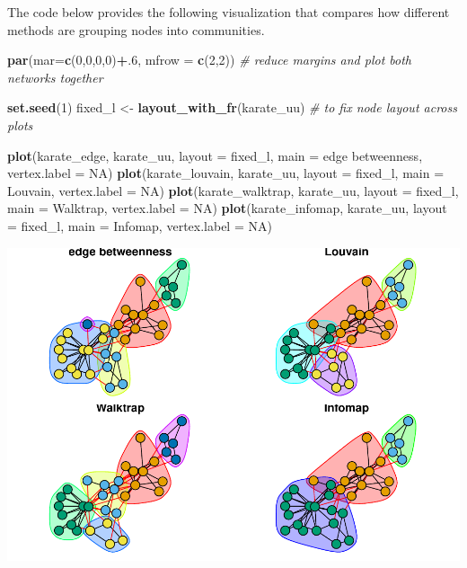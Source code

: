 \documentclass[
]{book}
\newenvironment{Shaded}{\begin{snugshade}}{\end{snugshade}}
\newcommand{\AttributeTok}[1]{\textcolor[rgb]{0.13,0.29,0.53}{#1}}
\newcommand{\CommentTok}[1]{\textcolor[rgb]{0.56,0.35,0.01}{\textit{#1}}}
\newcommand{\ConstantTok}[1]{\textcolor[rgb]{0.56,0.35,0.01}{#1}}
\newcommand{\DecValTok}[1]{\textcolor[rgb]{0.00,0.00,0.81}{#1}}
\newcommand{\FunctionTok}[1]{\textcolor[rgb]{0.13,0.29,0.53}{\textbf{#1}}}
\newcommand{\NormalTok}[1]{#1}
\newcommand{\OtherTok}[1]{\textcolor[rgb]{0.56,0.35,0.01}{#1}}
\newcommand{\SpecialCharTok}[1]{\textcolor[rgb]{0.81,0.36,0.00}{\textbf{#1}}}
\newcommand{\StringTok}[1]{\textcolor[rgb]{0.31,0.60,0.02}{#1}}
\begin{document}
The code below provides the following visualization that compares how different methods are grouping nodes into communities.

\begin{Shaded}
\begin{Highlighting}[]
\FunctionTok{par}\NormalTok{(}\AttributeTok{mar=}\FunctionTok{c}\NormalTok{(}\DecValTok{0}\NormalTok{,}\DecValTok{0}\NormalTok{,}\DecValTok{0}\NormalTok{,}\DecValTok{0}\NormalTok{)}\SpecialCharTok{+}\NormalTok{.}\DecValTok{6}\NormalTok{, }\AttributeTok{mfrow =} \FunctionTok{c}\NormalTok{(}\DecValTok{2}\NormalTok{,}\DecValTok{2}\NormalTok{)) }\CommentTok{\# reduce margins and plot both networks together}

\FunctionTok{set.seed}\NormalTok{(}\DecValTok{1}\NormalTok{)}
\NormalTok{fixed\_l }\OtherTok{\textless{}{-}} \FunctionTok{layout\_with\_fr}\NormalTok{(karate\_uu) }\CommentTok{\# to fix node layout across plots }

\FunctionTok{plot}\NormalTok{(karate\_edge, karate\_uu, }\AttributeTok{layout =}\NormalTok{ fixed\_l, }\AttributeTok{main =} \StringTok{\textquotesingle{}edge betweenness\textquotesingle{}}\NormalTok{, }\AttributeTok{vertex.label =} \ConstantTok{NA}\NormalTok{)}
\FunctionTok{plot}\NormalTok{(karate\_louvain, karate\_uu, }\AttributeTok{layout =}\NormalTok{ fixed\_l, }\AttributeTok{main =} \StringTok{\textquotesingle{}Louvain\textquotesingle{}}\NormalTok{, }\AttributeTok{vertex.label =} \ConstantTok{NA}\NormalTok{)}
\FunctionTok{plot}\NormalTok{(karate\_walktrap, karate\_uu, }\AttributeTok{layout =}\NormalTok{ fixed\_l, }\AttributeTok{main =} \StringTok{\textquotesingle{}Walktrap\textquotesingle{}}\NormalTok{, }\AttributeTok{vertex.label =} \ConstantTok{NA}\NormalTok{)}
\FunctionTok{plot}\NormalTok{(karate\_infomap, karate\_uu, }\AttributeTok{layout =}\NormalTok{ fixed\_l, }\AttributeTok{main =} \StringTok{\textquotesingle{}Infomap\textquotesingle{}}\NormalTok{, }\AttributeTok{vertex.label =} \ConstantTok{NA}\NormalTok{)}
\end{Highlighting}
\end{Shaded}

\includegraphics{bookdown-demo_files/figure-latex/unnamed-chunk-103-1.pdf}
\end{document}
